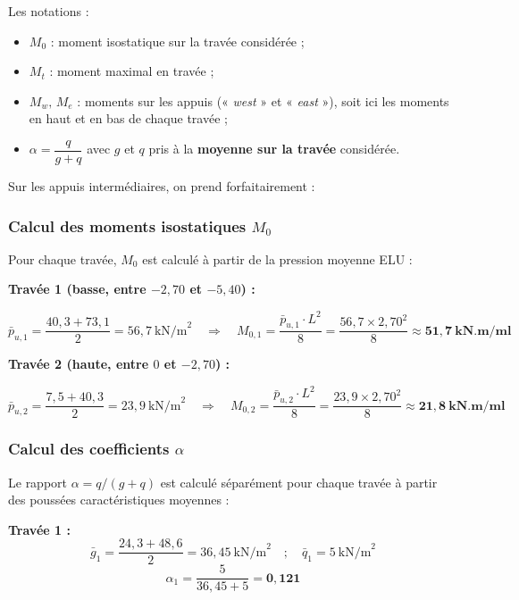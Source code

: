 Les notations :
\begin{itemize}
  \item $M_0$ : moment isostatique sur la travée considérée ;
  \item $M_t$ : moment maximal en travée ;
  \item $M_w, \, M_e$ : moments sur les appuis (« \textit{west} » et « \textit{east} »), soit ici les moments en haut et en bas de chaque travée ;
  \item $\alpha = \dfrac{q}{g + q}$ avec $g$ et $q$ pris à la \textbf{moyenne sur la travée} considérée.
\end{itemize}

Sur les appuis intermédiaires, on prend forfaitairement :


\subsubsection{Calcul des moments isostatiques \texorpdfstring{$M_0$}{M₀}}

Pour chaque travée, $M_0$ est calculé à partir de la pression moyenne ELU :

\textbf{Travée 1 (basse, entre $-2{,}70$ et $-5{,}40$) :}

\[
\bar{p}_{u,1} = \frac{40{,}3 + 73{,}1}{2} = 56{,}7~\text{kN/m}^2
\quad\Longrightarrow\quad
M_{0,1} = \frac{\bar{p}_{u,1} \cdot L^2}{8} = \frac{56{,}7 \times 2{,}70^2}{8} \approx \mathbf{51{,}7~\text{kN.m/ml}}
\]

\textbf{Travée 2 (haute, entre $0$ et $-2{,}70$) :}

\[
\bar{p}_{u,2} = \frac{7{,}5 + 40{,}3}{2} = 23{,}9~\text{kN/m}^2
\quad\Longrightarrow\quad
M_{0,2} = \frac{\bar{p}_{u,2} \cdot L^2}{8} = \frac{23{,}9 \times 2{,}70^2}{8} \approx \mathbf{21{,}8~\text{kN.m/ml}}
\]

\subsubsection{Calcul des coefficients \texorpdfstring{$\alpha$}{α}}

Le rapport $\alpha = q/(g+q)$ est calculé séparément pour chaque travée à partir des poussées caractéristiques moyennes :

\textbf{Travée 1 :}
\[
\bar{g}_1 = \frac{24{,}3 + 48{,}6}{2} = 36{,}45~\text{kN/m}^2
\quad ; \quad
\bar{q}_1 = 5~\text{kN/m}^2
\]
\[
\alpha_1 = \frac{5}{36{,}45 + 5} = \mathbf{0{,}121}
\]


